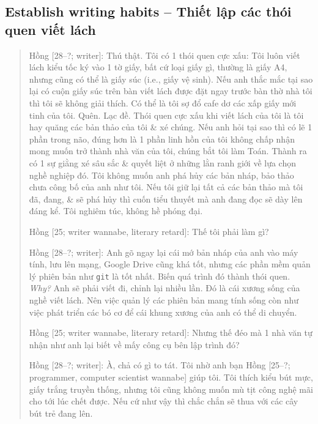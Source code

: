 \documentclass[12pt,oneside]{book}
\begin{document}
\subsection{Establish writing habits -- Thiết lập các thói quen viết lách}

\begin{quote}
	{\sf Hồng [28--?; writer]}: Thú thật. Tôi có 1 thói quen cực xấu: Tôi luôn viết lách kiểu tốc ký vào 1 tờ giấy, bất cứ loại giấy gì, thường là giấy A4, nhưng cũng có thể là giấy súc (i.e., giấy vệ sinh). Nếu anh thắc mắc tại sao lại có cuộn giấy súc trên bàn viết lách được đặt ngay trước bàn thờ nhà tôi thì tôi sẽ không giải thích. Có thể là tôi sợ đổ cafe dơ các xấp giấy mới tinh của tôi. Quên. Lạc đề. Thói quen cực xấu khi viết lách của tôi là tôi hay quăng các bản thảo của tôi \& xé chúng. Nếu anh hỏi tại sao thì có lẽ 1 phần trong não, đúng hơn là 1 phần linh hồn của tôi không chấp nhận mong muốn trở thành nhà văn của tôi, chúng bắt tôi làm Toán. Thành ra có 1 sự giằng xé sâu sắc \& quyết liệt ở những lằn ranh giới về lựa chọn nghề nghiệp đó. Tôi không muốn anh phá hủy các bản nháp, bảo thảo chưa công bố của anh như tôi. Nếu tôi giữ lại tất cả các bản thảo mà tôi đã, đang, \& sẽ phá hủy thì cuốn tiểu thuyết mà anh đang đọc sẽ dày lên đáng kể. Tôi nghiêm túc, không hề phóng đại.
	
	{\sf Hồng [25; writer wannabe, literary retard]}: Thế tôi phải làm gì?
	
	{\sf Hồng [28--?; writer]}: Anh gõ ngay lại cái mớ bản nháp của anh vào máy tính, lưu lên mạng, Google Drive cũng khá tốt, nhưng các phần mềm quản lý phiên bản như {\tt git} là tốt nhất. Biến quá trình đó thành thói quen. {\it Why?} Anh sẽ phải viết đi, chỉnh lại nhiều lần. Đó là cái xương sống của nghề viết lách. Nên việc quản lý các phiên bản mang tính sống còn như việc phát triển các bó cơ để cái khung xương của anh có thể di chuyển.
	
	{\sf Hồng [25; writer wannabe, literary retard]}: Nhưng thế đéo mà 1 nhà văn tự nhận như anh lại biết về mấy công cụ bên lập trình đó?
	
	{\sf Hồng [28--?; writer]}: À, chả có gì to tát. Tôi nhờ anh bạn {\sf Hồng [25--?; programmer, computer scientist wannabe]} giúp tôi. Tôi thích kiểu bút mực, giấy trắng truyền thống, nhưng tôi cũng không muốn mù tịt công nghệ mãi cho tới lúc chết được. Nếu cứ như vậy thì chắc chắn sẽ thua với các cây bút trẻ đang lên.
\end{quote}
\end{document}

